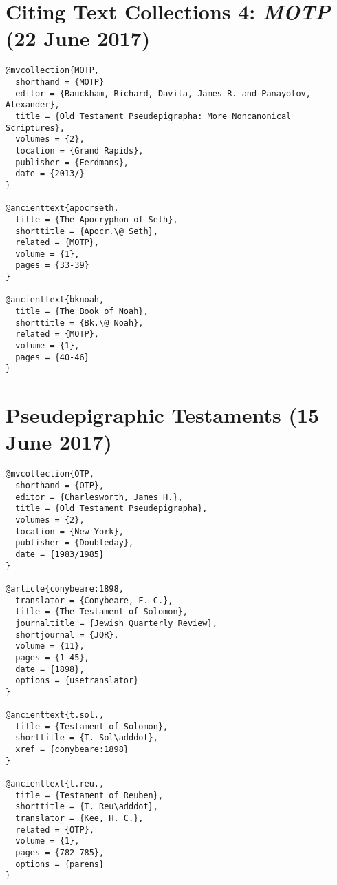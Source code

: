 \documentclass[a4paper]{article}
\renewcommand\footnote[1]{##1}%
\begin{document}
\section{Citing Text Collections 4: \emph{MOTP} (22 June 2017)}

\begin{verbatim}
@mvcollection{MOTP,
  shorthand = {MOTP}
  editor = {Bauckham, Richard, Davila, James R. and Panayotov, Alexander},
  title = {Old Testament Pseudepigrapha: More Noncanonical Scriptures},
  volumes = {2},
  location = {Grand Rapids},
  publisher = {Eerdmans},
  date = {2013/}
}

@ancienttext{apocrseth,
  title = {The Apocryphon of Seth},
  shorttitle = {Apocr.\@ Seth},
  related = {MOTP},
  volume = {1},
  pages = {33-39}
}

@ancienttext{bknoah,
  title = {The Book of Noah},
  shorttitle = {Bk.\@ Noah},
  related = {MOTP},
  volume = {1},
  pages = {40-46}
}
\end{verbatim}

\exampleancientsources
\examplesecondarysources
{}

\section{Pseudepigraphic Testaments (15 June 2017)}

\begin{verbatim}
@mvcollection{OTP,
  shorthand = {OTP},
  editor = {Charlesworth, James H.},
  title = {Old Testament Pseudepigrapha},
  volumes = {2},
  location = {New York},
  publisher = {Doubleday},
  date = {1983/1985}
}

@article{conybeare:1898,
  translator = {Conybeare, F. C.},
  title = {The Testament of Solomon},
  journaltitle = {Jewish Quarterly Review},
  shortjournal = {JQR},
  volume = {11},
  pages = {1-45},
  date = {1898},
  options = {usetranslator}
}

@ancienttext{t.sol.,
  title = {Testament of Solomon},
  shorttitle = {T. Sol\adddot},
  xref = {conybeare:1898}
}

@ancienttext{t.reu.,
  title = {Testament of Reuben},
  shorttitle = {T. Reu\adddot},
  translator = {Kee, H. C.},
  related = {OTP},
  volume = {1},
  pages = {782-785},
  options = {parens}
}
\end{verbatim}
\end{document}
